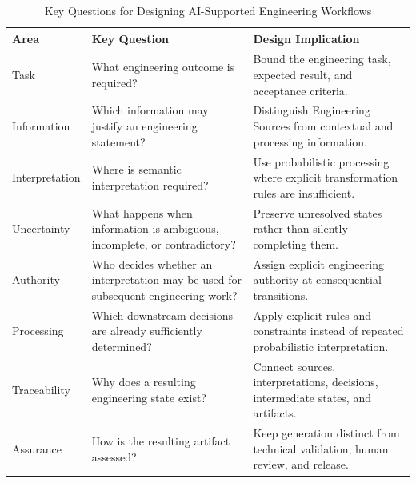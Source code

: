 \begin{table}[t]
\caption{Key Questions for Designing AI-Supported Engineering Workflows}
\label{tab:key_questions}
\centering
\renewcommand{\arraystretch}{1.15}
\begin{tabular}{p{} p{} p{}}
\toprule
\textbf{Area} &
\textbf{Key Question} &
\textbf{Design Implication} \\
\midrule

Task &
What engineering outcome is required? &
Bound the engineering task, expected result, and acceptance criteria. \\

Information &
Which information may justify an engineering statement? &
Distinguish Engineering Sources from contextual and processing information. \\

Interpretation &
Where is semantic interpretation required? &
Use probabilistic processing where explicit transformation rules are insufficient. \\

Uncertainty &
What happens when information is ambiguous, incomplete, or contradictory? &
Preserve unresolved states rather than silently completing them. \\

Authority &
Who decides whether an interpretation may be used for subsequent engineering work? &
Assign explicit engineering authority at consequential transitions. \\

Processing &
Which downstream decisions are already sufficiently determined? &
Apply explicit rules and constraints instead of repeated probabilistic interpretation. \\

Traceability &
Why does a resulting engineering state exist? &
Connect sources, interpretations, decisions, intermediate states, and artifacts. \\

Assurance &
How is the resulting artifact assessed? &
Keep generation distinct from technical validation, human review, and release. \\

\bottomrule
\end{tabular}
\end{table}
